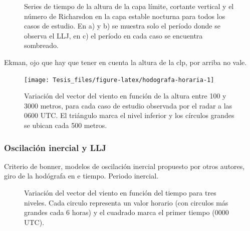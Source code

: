 \documentclass[12pt,spanish,oneside]{book}
\begin{document}
\begin{figure}
\newline{}\newline{}\caption{Series de tiempo de la altura de la capa límite, cortante vertical y el número de Richarsdon en la capa estable nocturna para todos los casos de estudio. En a) y b) se muestra solo el período donde se observa el LLJ, en c) el período en cada caso se encuentra sombreado. \label{estable-vad}}\label{fig:estable-vad}
\end{figure}

Ekman, ojo que hay que tener en cuenta la altura de la clp, por arriba
no vale.

\begin{figure}

{\centering \texttt{[image: Tesis\_files/figure-latex/hodografa-horaria-1]} 

}

\caption{Variación del vector del viento en función de la altura entre 100 y 3000 metros, para cada caso de estudio observada por el radar a las 0600 UTC. El triángulo marca el nivel inferior y los círculos grandes se ubican cada 500 metros. \label{hodografa-h}}\label{fig:hodografa-horaria}
\end{figure}

\subsubsection{Oscilación inercial y
LLJ}\label{oscilacion-inercial-y-llj}

Criterio de bonner, modelos de oscilación inercial propuesto por otros
autores, giro de la hodógrafa en e tiempo. Periodo inercial.

\begin{figure}

{\centering {}\newline{}

}

\caption{Variación del vector del viento en función del tiempo para tres niveles. Cada circulo representa un valor horario (con circulos más grandes cada 6 horas) y el cuadrado marca el primer tiempo (0000 UTC). \label{hodografa-n}}\label{fig:hodografa-nivel}
\end{figure}
\end{document}
